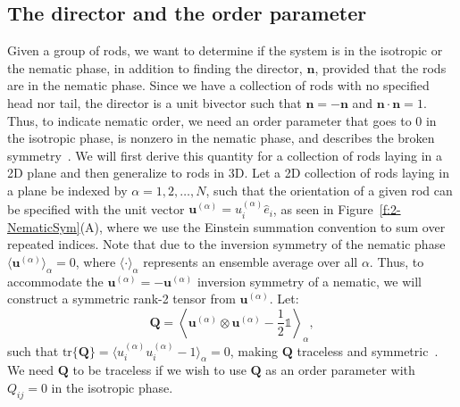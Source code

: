 \subsection{The director and the order parameter}
Given a group of rods, we want to determine if the system is in the isotropic or the nematic phase, in addition to finding the director, $\mathbf{n}$, provided that the rods are in the nematic phase.
Since we have a collection of rods with no specified head nor tail, the director is a unit bivector such that $\mathbf{n} = -\mathbf{n}$ and $\mathbf{n}\cdot\mathbf{n} = 1$.
Thus, to indicate nematic order, we need an order parameter that goes to $0$ in the isotropic phase, is nonzero in the nematic phase, and describes the broken symmetry~\cite{RN33,RN175}.
We will first derive this quantity for a collection of rods laying in a 2D plane and then generalize to rods in 3D.
Let a 2D collection of rods laying in a plane be indexed by $\alpha = 1,2,\dots, N$, such that the orientation of a given rod can be specified with the unit vector $\mathbf{u}^{(\alpha)} = u^{(\alpha)}_i\hat{e}_i$, as seen in Figure~\ref{f:2-NematicSym}(A), where we use the Einstein summation convention to sum over repeated indices.
Note that due to the inversion symmetry of the nematic phase $\langle \mathbf{u}^{(\alpha)}\rangle_{\alpha} = 0$, where $\langle \cdot \rangle_{\alpha}$ represents an ensemble average over all $\alpha$.
Thus, to accommodate the $\mathbf{u}^{(\alpha)} = -\mathbf{u}^{(\alpha)}$ inversion symmetry of a nematic, we will construct a symmetric rank-2 tensor from $\mathbf{u}^{(\alpha)}$.
Let:
\begin{equation}
  \mathbf{Q} = \left \langle \mathbf{u}^{(\alpha)} \otimes \mathbf{u}^{(\alpha)} - \frac{1}{2} \mathbb{1} \right \rangle_{\alpha},\label{e:2-2DOrderRaw}
\end{equation}
such that $\textrm{tr}\big \{ \mathbf{Q} \big \} = \langle u^{(\alpha)}_i u^{(\alpha)}_i - 1 \rangle_{\alpha} = 0$, making $\mathbf{Q}$ traceless and symmetric~\cite{RN33,RN175}.
We need $\mathbf{Q}$ to be traceless if we wish to use $\mathbf{Q}$ as an order parameter with $Q_{ij} = 0$ in the isotropic phase.

